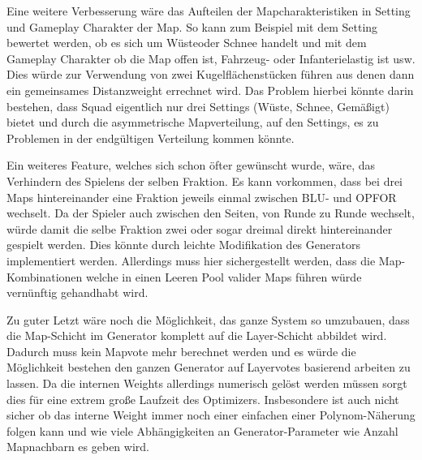         Eine weitere Verbesserung wäre das Aufteilen der Mapcharakteristiken in \glqq{}Setting\grqq{} und \glqq{}Gameplay\grqq{} Charakter der Map. 
        So kann zum Beispiel mit dem Setting bewertet werden, ob es sich um \glqq{}Wüste\grqq{}oder \glqq{}Schnee\grqq{} handelt 
        und mit dem Gameplay Charakter ob die Map offen ist, Fahrzeug- oder Infanterielastig ist usw. 
        Dies würde zur Verwendung von zwei Kugelflächenstücken führen aus denen dann ein gemeinsames Distanzweight errechnet wird. 
        Das Problem hierbei könnte darin bestehen, dass Squad eigentlich nur drei Settings (\glqq{}Wüste\grqq{}, \glqq{}Schnee\grqq{}, \glqq{}Gemäßigt\grqq{}) 
        bietet und durch die asymmetrische Mapverteilung, auf den Settings, es zu Problemen in der endgültigen Verteilung kommen könnte.

        Ein weiteres Feature, welches sich schon öfter gewünscht wurde, wäre, das Verhindern des \glqq{}Spielens der selben Fraktion\grqq{}.
        Es kann vorkommen, dass bei drei Maps hintereinander eine Fraktion jeweils einmal zwischen BLU- und OPFOR wechselt. 
        Da der Spieler auch zwischen den Seiten, von Runde zu Runde wechselt, würde damit die selbe Fraktion zwei oder sogar dreimal direkt hintereinander gespielt werden.
        Dies könnte durch leichte Modifikation des Generators implementiert werden. 
        Allerdings muss hier sichergestellt werden, dass die Map-Kombinationen welche in einen \glqq{}Leeren Pool valider Maps\grqq{} führen würde vernünftig gehandhabt wird.

        Zu guter Letzt wäre noch die Möglichkeit, das ganze System so umzubauen, dass die Map-Schicht im Generator komplett auf die Layer-Schicht abbildet wird.
        Dadurch muss kein Mapvote mehr berechnet werden und es würde die Möglichkeit bestehen den ganzen Generator auf Layervotes basierend arbeiten zu lassen.
        Da die internen Weights allerdings numerisch gelöst werden müssen sorgt dies für eine extrem große Laufzeit des Optimizers.
        Insbesondere ist auch nicht sicher ob das interne Weight immer noch einer 
        einfachen einer Polynom-Näherung folgen kann und wie viele Abhängigkeiten an Generator-Parameter wie \glqq{}Anzahl Mapnachbarn\grqq{} es geben wird. 